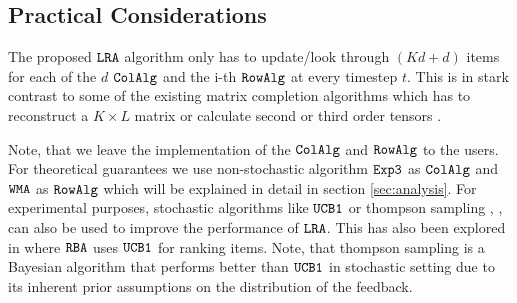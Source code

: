 \subsection{Practical Considerations}
\label{sec:practical considerations}

The proposed ${\tt LRA}$ algorithm only has to update/look through $(Kd + d)$ items for each of the $d$ ${\tt ColAlg}$ and the i-th ${\tt RowAlg}$ at every timestep $t$. This is in stark contrast to some of the existing matrix completion algorithms which has to reconstruct a $K\times L$ matrix \citep{sen2016contextual} or calculate second or third order tensors \citep{gopalan2016low}. 




Note, that we leave the implementation of the ${\tt ColAlg}$ and ${\tt RowAlg}$ to the users. For theoretical guarantees we use non-stochastic algorithm ${\tt Exp3}$ as ${\tt ColAlg}$ and ${\tt WMA}$ as ${\tt RowAlg}$ which will be explained in detail in section \cref{sec:analysis}. For experimental purposes, stochastic algorithms like ${\tt UCB1}$ or thompson sampling \citep{thompson1933likelihood}, \citep{thompson1935theory}, \citep{agrawal2012analysis} can also be used to improve the performance of ${\tt LRA}$. This has also been explored in \citet{radlinski2008learning} where ${\tt RBA}$ uses ${\tt UCB1}$ for ranking items. Note, that thompson sampling is a Bayesian algorithm that performs better than ${\tt UCB1}$ in stochastic setting due to its inherent prior assumptions on the distribution of the feedback.


